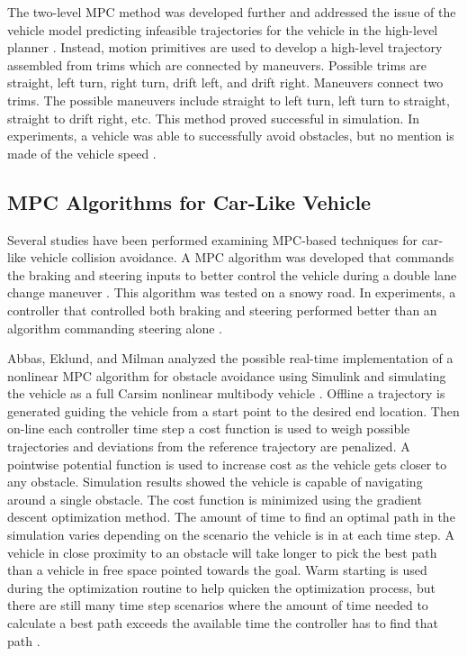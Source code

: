 \documentclass[12pt,onecolumn]{report}
\begin{document}
The two-level MPC method was developed further and addressed the issue of the vehicle model predicting infeasible trajectories for the vehicle in the high-level planner \cite{Gray&Gao2012}. Instead, motion primitives are used to develop a high-level trajectory assembled from trims which are connected by maneuvers. Possible trims are straight, left turn, right turn, drift left, and drift right. Maneuvers connect two trims. The possible maneuvers include straight to left turn, left turn to straight, straight to drift right, etc. This method proved successful in simulation. In experiments, a vehicle was able to successfully avoid obstacles, but no mention is made of the vehicle speed \cite{Gray&Gao2012}.

\subsection{MPC Algorithms for Car-Like Vehicle}\label{ss:MPCforCars}

Several studies have been performed examining MPC-based techniques for car-like vehicle collision avoidance. A MPC algorithm was developed that commands the braking and steering inputs to better control the vehicle during a double lane change maneuver \cite{Falcone2007}. This algorithm was tested on a snowy road. In experiments, a controller that controlled both braking and steering performed better than an algorithm commanding steering alone \cite{Falcone2007}.

Abbas, Eklund, and Milman analyzed the possible real-time implementation of a nonlinear MPC algorithm for obstacle avoidance using Simulink and simulating the vehicle as a full Carsim nonlinear multibody vehicle \cite{Abbas&Eklund2012}. Offline a trajectory is generated guiding the vehicle from a start point to the desired end location. Then on-line each controller time step a cost function is used to weigh possible trajectories and deviations from the reference trajectory are penalized. A pointwise potential function is used to increase cost as the vehicle gets closer to any obstacle. Simulation results showed the vehicle is capable of navigating around a single obstacle. The cost function is minimized using the gradient descent optimization method. The amount of time to find an optimal path in the simulation varies depending on the scenario the vehicle is in at each time step. A vehicle in close proximity to an obstacle will take longer to pick the best path than a vehicle in free space pointed towards the goal. Warm starting is used during the optimization routine to help quicken the optimization process, but there are still many time step scenarios where the amount of time needed to calculate a best path exceeds the available time the controller has to find that path \cite{Abbas&Eklund2012}.
\end{document}
